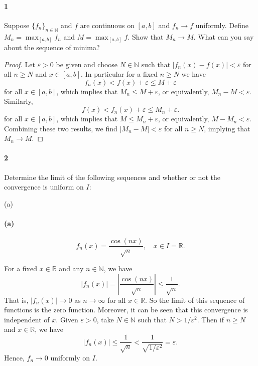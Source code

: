 \documentclass[12pt]{article}
\newenvironment{fullbox}{\begin{lrbox}{\savefullbox}\begin{minipage}{\dimexpr\textwidth-2\fboxsep\relax}}{\end{minipage}\end{lrbox}\begin{center}\framebox[\textwidth]{\usebox{\savefullbox}}\end{center}}
\newenvironment{pbox}[1][]{\begin{fullbox}\ifx#1\empty\else\paragraph{#1}\fi}{\end{fullbox}}
\theoremstyle{definition}
\newcommand{\N}{\mathbb{N}}
\newcommand{\R}{\mathbb{R}}
\newcommand{\eps}{\varepsilon}
\begin{document}
\thispagestyle{title}


\begin{pbox}[1]
    Suppose $\{f_n\}_{n\in\N}$ and $f$ are continuous on $[a,b]$ and $f_n \to f$ uniformly. Define $M_n = \max_{[a,b]} f_n$ and $M = \max_{[a,b]} f$. Show that $M_n\to M$. What can you say about the sequence of minima?
\end{pbox}

\begin{proof}
    Let $\eps > 0$ be given and choose $N \in \N$ such that $|f_n(x) - f(x)| < \eps$ for all $n \geq N$ and $x \in [a, b]$. In particular for a fixed $n \geq N$ we have
    \[
        f_n(x) < f(x) + \eps \leq M + \eps
    \]
    for all $x \in [a, b]$, which implies that $M_n \leq M + \eps$, or equivalently, $M_n - M < \eps$. Similarly,
    \[
        f(x) < f_n(x) + \eps \leq M_n + \eps.
    \]
    for all $x \in [a, b]$, which implies that $M \leq M_n + \eps$, or equivalently, $M - M_n < \eps$. Combining these two results, we find $|M_n - M| < \eps$ for all $n \geq N$, implying that $M_n \to M$.
    
    
    
    
    
\end{proof}


\newpage
\begin{pbox}[2]
    Determine the limit of the following sequences and whether or not the convergence is uniform on $I$:
\end{pbox}

\begin{pbox}[(a)]
    \begin{equation}
    f_n(x) = \frac{\cos (nx)}{\sqrt{n}},\quad x\in I = \R.
    \end{equation}
\end{pbox}

For a fixed $x \in \R$ and any $n \in \N$, we have
\[
    \left|f_n(x)\right|
        = \left|\frac{\cos (nx)}{\sqrt{n}}\right|
        \leq \frac{1}{\sqrt{n}}.
\]
That is, $|f_n(x)| \to 0$ as $n \to \infty$ for all $x \in \R$. So the limit of this sequence of functions is the zero function. Moreover, it can be seen that this convergence is independent of $x$. Given $\eps > 0$, take $N \in \N$ such that $N > 1/\eps^2$. Then if $n \geq N$ and $x \in \R$, we have
\[
    |f_n(x)|
        \leq \frac{1}{\sqrt{n}}
        < \frac{1}{\sqrt{1/\eps^2}}
        = \eps.
\]
Hence, $f_n \to 0$ uniformly on $I$.
\end{document}
